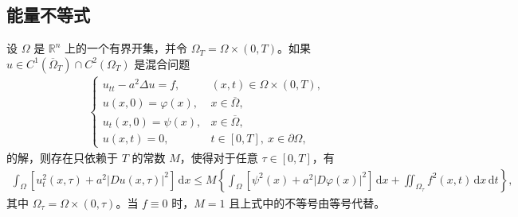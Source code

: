 \documentclass[../../main.tex]{subfiles}%
\begin{document}
\subsection{能量不等式}

\begin{theorem}
设 $\Omega$ 是 $\mathbb{R}^n$ 上的一个有界开集，并令 $\Omega_T=\Omega\times(0,T)$。如果 $u\in C^1(\overline{\Omega}_T)\cap C^2(\Omega_T)$ 是混合问题
\begin{align}
\begin{cases}
u_{tt}-a^2\Delta u=f, & (x,t)\in\Omega\times(0,T), \\
u(x,0)=\varphi(x), & x\in\overline{\Omega}, \\
u_t(x,0)=\psi(x), & x\in\overline{\Omega}, \\
u(x,t)=0, & t\in[0,T],\ x\in\partial\Omega,
\end{cases} \label{eq:wave-mixed-energy-gen}
\end{align}
的解，则存在只依赖于 $T$ 的常数 $M$，使得对于任意 $\tau\in[0,T]$，有
\begin{align}
\int_\Omega [u_t^2(x,\tau)+a^2|Du(x,\tau)|^2]\,\mathrm{d}x
\leqslant M\left\{\int_\Omega[\psi^2(x)+a^2|D\varphi(x)|^2]\,\mathrm{d}x+\iint_{\Omega_\tau}f^2(x,t)\,\mathrm{d}x\,\mathrm{d}t\right\}, \label{eq:energy-est-wave}
\end{align}
其中 $\Omega_\tau=\Omega\times(0,\tau)$。当 $f\equiv 0$ 时，$M=1$ 且上式中的不等号由等号代替。
\end{theorem}
\end{document}
